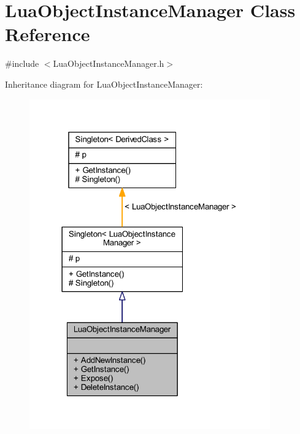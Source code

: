 \hypertarget{class_lua_object_instance_manager}{}\section{Lua\+Object\+Instance\+Manager Class Reference}
\label{class_lua_object_instance_manager}


{\ttfamily \#include $<$Lua\+Object\+Instance\+Manager.\+h$>$}



Inheritance diagram for Lua\+Object\+Instance\+Manager\+:\nopagebreak
\begin{figure}[H]
\begin{center}
\leavevmode
\includegraphics[width=294pt]{class_lua_object_instance_manager__inherit__graph}
\end{center}
\end{figure}



